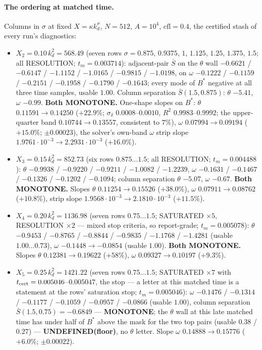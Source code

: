 \documentclass[11pt,a4paper]{article}
\newcommand{\kd}{k_d}
\newcommand{\tcert}{t_{\rm cert}}
\newcommand{\tm}{t_m}
\newcommand{\Bst}{B^*}
\newcommand{\Sbar}{\bar S}
\begin{document}
\paragraph{The ordering at matched time.} Columns in $\sigma$ at fixed $X=\kappa\kd^\sigma$, $N=512$, $A=10^4$, $\mathrm{cfl}=0.4$, the certified stash of every run's diagnostics:
\begin{itemize}[leftmargin=1.5em]
\item $X_2=0.10\,\kd^2=568.49$ (seven rows $\sigma=0.875$, $0.9375$, $1$, $1.125$, $1.25$, $1.375$, $1.5$; all RESOLUTION; $\tm=0.003714$): adjacent-pair $\Sbar$ on the $\theta$ wall $-0.6621$ / $-0.6147$ / $-1.1152$ / $-1.0165$ / $-0.9815$ / $-1.0198$, on $\omega$ $-0.1222$ / $-0.1159$ / $-0.2151$ / $-0.1958$ / $-0.1790$ / $-0.1643$; every mode of $\Bst$ negative at all three time samples, usable $1.00$. Column separation $\Sbar(1.5,0.875)$: $\theta$ $-5.41$, $\omega$ $-0.99$. \textbf{Both MONOTONE.} One-shape slopes on $\Bst$: $\theta$ $0.11591\to0.14250$ ($+22.9\%$; $\sigma_\delta$ $0.0008$--$0.0010$, $R^2$ $0.9983$--$0.9992$; the upper-quarter band $0.10744\to0.13557$, consistent to $7\%$), $\omega$ $0.07994\to0.09194$ ($+15.0\%$; $\pm0.00023$), the solver's own-band $\omega$ strip slope $1.9761\cdot10^{-3}\to2.2931\cdot10^{-3}$ ($+16.0\%$).
\item $X_3=0.15\,\kd^2=852.73$ (six rows $0.875\dots1.5$; all RESOLUTION; $\tm=0.004488$): $\theta$ $-0.9938$ / $-0.9220$ / $-0.9211$ / $-1.0082$ / $-1.2239$, $\omega$ $-0.1631$ / $-0.1467$ / $-0.1326$ / $-0.1202$ / $-0.1094$; column separation $\theta$ $-5.07$, $\omega$ $-0.67$. \textbf{Both MONOTONE.} Slopes $\theta$ $0.11254\to0.15526$ ($+38.0\%$), $\omega$ $0.07911\to0.08762$ ($+10.8\%$), strip slope $1.9568\cdot10^{-3}\to2.1810\cdot10^{-3}$ ($+11.5\%$).
\item $X_4=0.20\,\kd^2=1136.98$ (seven rows $0.75\dots1.5$; SATURATED $\times5$, RESOLUTION $\times2$ --- mixed stop criteria, so report-grade; $\tm=0.005078$): $\theta$ $-0.9453$ / $-0.8765$ / $-0.8844$ / $-0.9835$ / $-1.1768$ / $-1.4281$ (usable $1.00\dots0.73$), $\omega$ $-0.1448\to-0.0854$ (usable $1.00$). \textbf{Both MONOTONE.} Slopes $\theta$ $0.12381\to0.19622$ ($+58\%$), $\omega$ $0.09327\to0.10197$ ($+9.3\%$).
\item $X_5=0.25\,\kd^2=1421.22$ (seven rows $0.75\dots1.5$; SATURATED $\times7$ with $\tcert=0.005046$--$0.005047$, the stop --- a letter at this matched time is a statement at the rows' saturation stop; $\tm=0.005046$): $\omega$ $-0.1476$ / $-0.1314$ / $-0.1177$ / $-0.1059$ / $-0.0957$ / $-0.0866$ (usable $1.00$), column separation $\Sbar(1.5,0.75)=-0.6849$ --- \textbf{MONOTONE}; the $\theta$ wall at this late matched time has under half of $\Bst$ above the mask for the two top pairs (usable $0.38$ / $0.27$) --- \textbf{UNDEFINED(floor)}, no $\theta$ letter. Slope $\omega$ $0.14888\to0.15776$ ($+6.0\%$; $\pm0.00022$).

\end{itemize}
\end{document}

